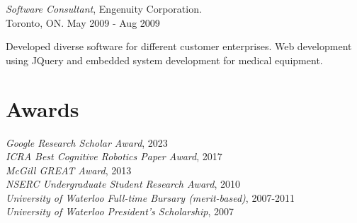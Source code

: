 \documentclass[line,margin,letterpaper]{res}
\begin{document}
\begin{resume}
{\sl Software Consultant}, Engenuity Corporation.
\\ \hfill Toronto, ON. May 2009 - Aug 2009
\begin{list}{}
\item Developed diverse software for different customer enterprises. Web development using JQuery and embedded system development for medical equipment.
\end{list}



\section{Awards}
{\sl Google Research Scholar Award}, 2023
\\
{\sl ICRA Best Cognitive Robotics Paper Award}, 2017
\\
{\sl McGill GREAT Award}, 2013
\\
{\sl NSERC Undergraduate Student Research Award}, 2010
\\
{\sl University of Waterloo Full-time Bursary (merit-based)}, 2007-2011
\\
{\sl University of Waterloo President's Scholarship}, 2007

\iffalse
\section{References}

\textbf{Leslie Pack Kaelbling} {\small lpk@mit.edu}\\
Panasonic Professor of Computer Science and Engineering, MIT

\textbf{Tom\'{a}s Lozano-P\'{e}rez} {\small tlp@mit.edu}\\
School of Engineering Professor in Teaching Excellence, MIT

\textbf{Joelle Pineau} {\small jpineau@cs.mcgill.ca}\\
Associate Professor, McGill University

\textbf{Doina Precup} {\small dprecup@cs.mcgill.ca}\\
Associate Professor, McGill University
\fi
\end{resume}
\end{document}
